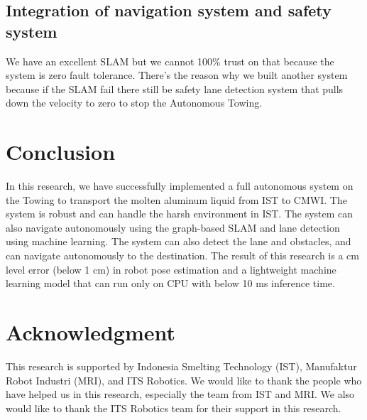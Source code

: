 \documentclass[conference]{IEEEtran}
\begin{document}
\subsection{Integration of navigation system and safety system} 
We have an excellent SLAM but we cannot 100\% trust on that because the system is zero fault tolerance. There's the reason why we built another system because if the SLAM fail there still be safety lane detection system that pulls down the velocity to zero to stop the Autonomous Towing. 

\section{Conclusion} 
In this research, we have successfully implemented a full autonomous system on the Towing to transport the molten aluminum liquid from IST to CMWI. The system is robust and can handle the harsh environment in IST. The system can also navigate autonomously using the graph-based SLAM and lane detection using machine learning. The system can also detect the lane and obstacles, and can navigate autonomously to the destination. The result of this research is a cm level error (below 1 cm) in robot pose estimation and a lightweight machine learning model that can run only on CPU with below 10 ms inference time. 

\section{Acknowledgment}
This research is supported by Indonesia Smelting Technology (IST), Manufaktur Robot Industri (MRI), and ITS Robotics. We would like to thank the people who have helped us in this research, especially the team from IST and MRI. We also would like to thank the ITS Robotics team for their support in this research. 





\end{document}
